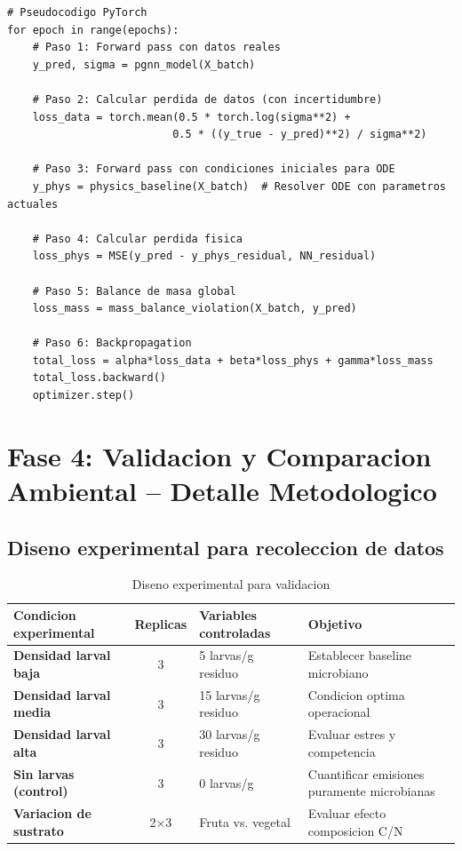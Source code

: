 \documentclass[12pt]{article}
\begin{document}
\begin{lstlisting}[caption=Pseudocodigo PyTorch para entrenamiento PGNN]
# Pseudocodigo PyTorch
for epoch in range(epochs):
    # Paso 1: Forward pass con datos reales
    y_pred, sigma = pgnn_model(X_batch)

    # Paso 2: Calcular perdida de datos (con incertidumbre)
    loss_data = torch.mean(0.5 * torch.log(sigma**2) +
                          0.5 * ((y_true - y_pred)**2) / sigma**2)

    # Paso 3: Forward pass con condiciones iniciales para ODE
    y_phys = physics_baseline(X_batch)  # Resolver ODE con parametros actuales

    # Paso 4: Calcular perdida fisica
    loss_phys = MSE(y_pred - y_phys_residual, NN_residual)

    # Paso 5: Balance de masa global
    loss_mass = mass_balance_violation(X_batch, y_pred)

    # Paso 6: Backpropagation
    total_loss = alpha*loss_data + beta*loss_phys + gamma*loss_mass
    total_loss.backward()
    optimizer.step()
\end{lstlisting}

\newpage

\section{Fase 4: Validacion y Comparacion Ambiental -- Detalle Metodologico}

\subsection{Diseno experimental para recoleccion de datos}

\begin{table}[H]
\centering
\caption{Diseno experimental para validacion}
\label{tab:experimental_design}
\begin{tabular}{|l|c|l|l|}
\hline
\textbf{Condicion experimental} & \textbf{Replicas} & \textbf{Variables controladas} & \textbf{Objetivo} \\ \hline
\textbf{Densidad larval baja} & 3 & 5 larvas/g residuo & Establecer baseline microbiano \\ \hline
\textbf{Densidad larval media} & 3 & 15 larvas/g residuo & Condicion optima operacional \\ \hline
\textbf{Densidad larval alta} & 3 & 30 larvas/g residuo & Evaluar estres y competencia \\ \hline
\textbf{Sin larvas (control)} & 3 & 0 larvas/g & Cuantificar emisiones puramente microbianas \\ \hline
\textbf{Variacion de sustrato} & 2$\times$3 & Fruta vs. vegetal & Evaluar efecto composicion C/N \\ \hline
\end{tabular}
\end{table}
\end{document}
